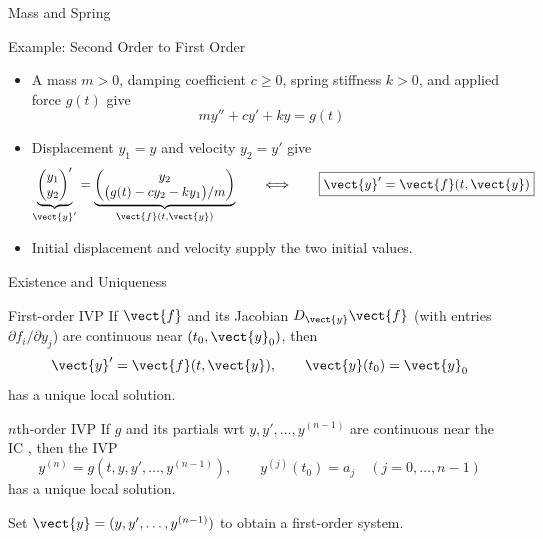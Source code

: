 \begin{frame}{Mass and Spring}
\begin{block}{Example: Second Order to First Order}
\begin{itemize}
  \item A mass $m>0$, damping coefficient $c\geq0$, spring stiffness $k>0$, and applied force $g(t)$ give
  \[
    my''+cy'+ky=g(t)
  \]
  \item Displacement $y_1=y$ and velocity $y_2=y'$ give
  \[
    \underbrace{\begin{pmatrix} y_1 \\ y_2 \end{pmatrix}'}_{\vect{y}'}
    =\underbrace{\begin{pmatrix}
      y_2 \\
      \bigl(g(t)-cy_2-ky_1\bigr)/m
    \end{pmatrix}}_{\vect{f}(t,\vect{y})}
    \qquad\Longleftrightarrow\qquad
    \boxed{\vect{y}'=\vect{f}(t,\vect{y})}
  \]
  \item Initial displacement and velocity supply the two initial values.
\end{itemize}
\end{block}
\end{frame}

\begin{frame}{Existence and Uniqueness}
\begin{block}{First-order IVP}
If $\vect{f}$ and its Jacobian $D_{\vect{y}}\vect{f}$ (with entries $\partial f_i/\partial y_j$) are continuous near $(t_0,\vect{y}_0)$, then
\[
  \vect{y}'=\vect{f}(t,\vect{y}),\qquad \vect{y}(t_0)=\vect{y}_0
\]
has a unique local solution.
\end{block}
\begin{block}{$n$th-order IVP}
If $g$ and its partials wrt  $y,y',\ldots,y^{(n-1)}$ are continuous near the IC , then the IVP
\[
  y^{(n)}=g(t,y,y',\ldots,y^{(n-1)}),\qquad
  y^{(j)}(t_0)=a_j\quad (j=0,\ldots,n-1)
\]
has a unique local solution.
\end{block}
Set $\vect{y}=(y,y',\ldots,y^{(n-1)})$ to obtain a first-order system.
\end{frame}
